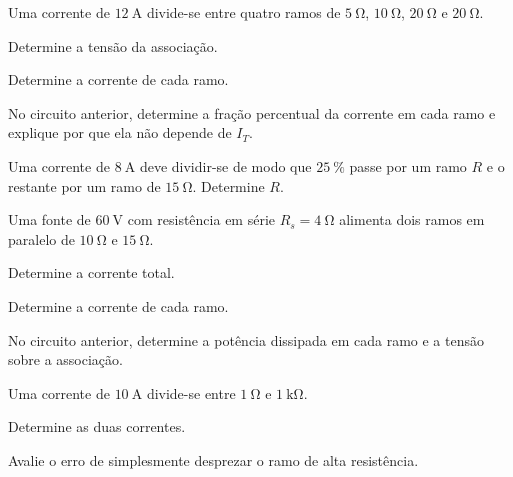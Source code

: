 \blocoaplicacao
\begin{questao}[2]{}

Uma corrente de $\SI{12}{\ampere}$ divide-se entre quatro ramos de
$\SI{5}{\ohm}$, $\SI{10}{\ohm}$, $\SI{20}{\ohm}$ e $\SI{20}{\ohm}$.
\begin{itensq}
\item Determine a tensão da associação.
\item Determine a corrente de cada ramo.
\end{itensq}


\end{questao}
\begin{questao}[2]{}

No circuito anterior, determine a fração percentual da corrente em cada ramo e
explique por que ela não depende de $I_T$.


\end{questao}
\begin{questao}[2]{}

Uma corrente de $\SI{8}{\ampere}$ deve dividir-se de modo que
$\SI{25}{\percent}$ passe por um ramo $R$ e o restante por um ramo de
$\SI{15}{\ohm}$. Determine $R$.


\end{questao}
\begin{questao}[2]{}

Uma fonte de $\SI{60}{\volt}$ com resistência em série $R_s=\SI{4}{\ohm}$ alimenta
dois ramos em paralelo de $\SI{10}{\ohm}$ e $\SI{15}{\ohm}$.
\begin{itensq}
\item Determine a corrente total.
\item Determine a corrente de cada ramo.
\end{itensq}


\end{questao}
\begin{questao}[2]{}

No circuito anterior, determine a potência dissipada em cada ramo e a tensão
sobre a associação.


\end{questao}
\begin{questao}[2]{}

Uma corrente de $\SI{10}{\ampere}$ divide-se entre $\SI{1}{\ohm}$ e
$\SI{1}{\kilo\ohm}$.
\begin{itensq}
\item Determine as duas correntes.
\item Avalie o erro de simplesmente desprezar o ramo de alta resistência.
\end{itensq}


\end{questao}
